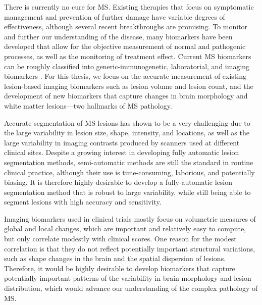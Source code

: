 There is currently no cure for MS. Existing therapies that focus on symptomatic
management and prevention of further damage have variable degrees of
effectiveness, although several recent breakthroughs are promising. To monitor
and further our understanding of the disease, many biomarkers have been
developed that allow for the objective measurement of normal and pathogenic
processes, as well as the monitoring of treatment effect. Current MS biomarkers
can be roughly classified into generic-immunogenetic, laboratorial, and imaging
biomarkers \citep{katsavos2013}. For this thesis, we focus on the accurate
measurement of existing lesion-based imaging biomarkers such as lesion volume
and lesion count, and the development of new biomarkers that capture changes in
brain morphology and white matter lesions---two hallmarks of MS pathology.

Accurate segmentation of MS lesions has shown to be a very challenging due to
the large variability in lesion size, shape, intensity, and locations, as well
as the large variability in imaging contrasts produced by scanners used at
different clinical sites. Despite a growing interest in developing fully
automatic lesion segmentation methods, semi-automatic methods are still the
standard in routine clinical practice, although their use is time-consuming,
laborious, and potentially biasing. It is therefore highly desirable to develop
a fully-automatic lesion segmentation method that is robust to large
variability, while still being able to segment lesions with high accuracy and
sensitivity.

%

Imaging biomarkers used in clinical trials mostly focus on volumetric measures
of global and local changes, which are important and relatively easy to compute,
but only correlate modestly with clinical scores. One reason for the modest
correlation is that they do not reflect potentially important structural
variations, such as shape changes in the brain and the spatial dispersion of
lesions. Therefore, it would be highly desirable to develop biomarkers that
capture potentially important patterns of the variability in brain morphology
and lesion distribution, which would advance our understanding of the complex
pathology of MS.

